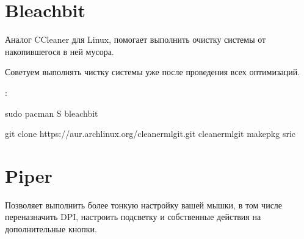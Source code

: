 \documentclass[letterpaper,10pt,russian,openany]{sphinxmanual}
\begin{document}
\ignorespaces 

\section{Bleachbit}
\label{\detokenize{source/useful-programs:bleachbit}}\label{\detokenize{source/useful-programs:index-1}}\label{\detokenize{source/useful-programs:id3}}
\sphinxAtStartPar
Аналог CCleaner для Linux, помогает выполнить очистку системы от накопившегося в ней мусора.

\sphinxAtStartPar
Советуем выполнять чистку системы уже после проведения всех оптимизаций.

\noindent{}

\sphinxAtStartPar
{}:

\begin{sphinxVerbatim}[commandchars=\\\{\}]
sudo pacman \PYGZhy{}S bleachbit


git clone https://aur.archlinux.org/cleanerml\PYGZhy{}git.git 
 cleanerml\PYGZhy{}git                                      
makepkg \PYGZhy{}sric                                         
\end{sphinxVerbatim}

\ignorespaces 

\section{Piper}
\label{\detokenize{source/useful-programs:piper}}\label{\detokenize{source/useful-programs:paper}}\label{\detokenize{source/useful-programs:index-2}}
\sphinxAtStartPar
Позволяет выполнить более тонкую настройку вашей мышки, в том числе переназначить DPI, настроить подсветку и собственные действия на дополнительные кнопки.

\noindent{}
\end{document}
